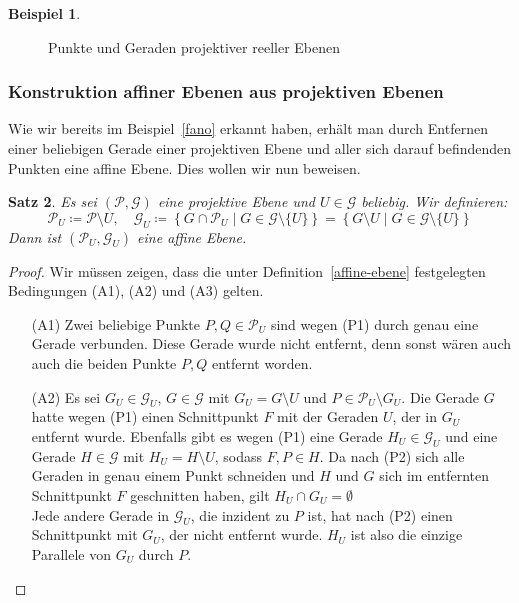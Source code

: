 \documentclass[hidelinks]{article}
\theoremstyle{plain}
\newtheorem{thm}{Satz}[section]
\theoremstyle{definition}
\newtheorem{bsp}[thm]{Beispiel}
\theoremstyle{rem}
\newcommand{\pu}{\mathcal{P}_U}
\newcommand{\gu}{\mathcal{G}_U}
\begin{document}
\begin{sloppypar}
\begin{bsp}
\begin{figure}[H]
\begin{tikzpicture}[
		tdplot_main_coords,
		axis/.style={->,black,thick},
		line/.style={thick,red},
		scale=0.8]
\end{tikzpicture}
	\caption{Punkte und Geraden projektiver reeller Ebenen}
\end{figure}
\end{bsp}


\subsubsection{Konstruktion affiner Ebenen aus projektiven Ebenen} \label{konstr-aff-aus-proj}
Wie wir bereits im Beispiel~\ref{fano} erkannt haben, erhält man durch Entfernen einer beliebigen Gerade einer projektiven Ebene und aller sich darauf befindenden Punkten eine affine Ebene. Dies wollen wir nun beweisen.
\begin{thm} \label{projektive-zu-affinen}
Es sei $(\mathcal{P},\mathcal{G})$ eine projektive Ebene und $U\in\mathcal{G}$ beliebig. Wir definieren:
\begin{equation*}
	\pu\coloneqq\mathcal{P}\setminus{U},\quad \gu\coloneqq\left\{G\cap\pu\mid G\in\mathcal{G}\setminus\{U\}\right\}=\left\{G\setminus U\mid G\in\mathcal{G}\setminus \{U\}\right\}
\end{equation*}
Dann ist $(\pu,\gu)$ eine affine Ebene.
\end{thm}
\begin{proof}
Wir müssen zeigen, dass die unter Definition~\ref{affine-ebene} festgelegten Bedingungen (A1), (A2) und (A3) gelten.
\begin{enumerate}
	\item[(A1)] Zwei beliebige Punkte $P,Q\in\pu$ sind wegen (P1) durch genau eine Gerade verbunden. Diese Gerade wurde nicht entfernt, denn sonst wären auch auch die beiden Punkte $P,Q$ entfernt worden.
	\item[(A2)] Es sei $G_U\in\gu$, $G\in\mathcal{G}$ mit $G_U=G\setminus U$ und $P\in\pu\setminus G_U$. Die Gerade $G$ hatte wegen (P1) einen Schnittpunkt $F$ mit der Geraden $U$, der in $G_U$ entfernt wurde. Ebenfalls gibt es wegen (P1) eine Gerade $H_U\in\gu$ und eine Gerade $H\in\mathcal{G}$ mit $H_U=H\setminus U$, sodass $F,P\in H$. Da nach (P2) sich alle Geraden in genau einem Punkt schneiden und $H$ und $G$ sich im entfernten Schnittpunkt $F$ geschnitten haben, gilt $H_U\cap G_U=\emptyset$\\
	Jede andere Gerade in $\gu$, die inzident zu $P$ ist, hat nach (P2) einen Schnittpunkt mit $G_U$, der nicht entfernt wurde. $H_U$ ist also die einzige Parallele von $G_U$ durch $P$.
\begin{figure}[H]
\centering

\end{figure}
\end{enumerate}
\end{proof}
\end{sloppypar}
\end{document}
